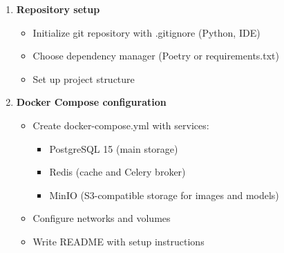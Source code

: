 \documentclass[12pt,a4paper]{article}
\begin{document}
\begin{enumerate}
    \item \textbf{Repository setup}
    \begin{itemize}
        \item Initialize git repository with .gitignore (Python, IDE)
        \item Choose dependency manager (Poetry or requirements.txt)
        \item Set up project structure
    \end{itemize}
    
    \item \textbf{Docker Compose configuration}
    \begin{itemize}
        \item Create docker-compose.yml with services:
        \begin{itemize}
            \item PostgreSQL 15 (main storage)
            \item Redis (cache and Celery broker)
            \item MinIO (S3-compatible storage for images and models)
        \end{itemize}
        \item Configure networks and volumes
        \item Write README with setup instructions
    \end{itemize}
    

\end{enumerate}
\end{document}
